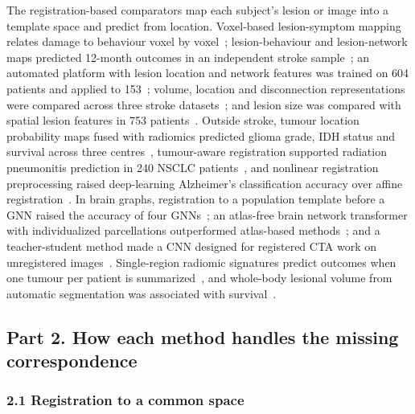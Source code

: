 \documentclass[journal,onecolumn]{IEEEtran}
\begin{document}
The registration-based comparators map each subject's lesion or image into a template space and predict from location. Voxel-based lesion-symptom mapping relates damage to behaviour voxel by voxel~\cite{Bates2003Voxel}; lesion-behaviour and lesion-network maps predicted 12-month outcomes in an independent stroke sample~\cite{Bowren2022Poststroke}; an automated platform with lesion location and network features was trained on 604 patients and applied to 153~\cite{Brzus2026Clinical}; volume, location and disconnection representations were compared across three stroke datasets~\cite{Bonkhoff2024Prediction}; and lesion size was compared with spatial lesion features in 753 patients~\cite{Sperber2023Stroke}. Outside stroke, tumour location probability maps fused with radiomics predicted glioma grade, IDH status and survival across three centres~\cite{Liu2023Coordinatized}, tumour-aware registration supported radiation pneumonitis prediction in 240 NSCLC patients~\cite{Choi2026Tumor}, and nonlinear registration preprocessing raised deep-learning Alzheimer's classification accuracy over affine registration~\cite{Fujibayashi2021Nonlinear}. In brain graphs, registration to a population template before a GNN raised the accuracy of four GNNs~\cite{Gurler2023Template}; an atlas-free brain network transformer with individualized parcellations outperformed atlas-based methods~\cite{Huang2026Atlas}; and a teacher-student method made a CNN designed for registered CTA work on unregistered images~\cite{Dong2024Self}. Single-region radiomic signatures predict outcomes when one tumour per patient is summarized~\cite{Aerts2014Decoding}, and whole-body lesional volume from automatic segmentation was associated with survival~\cite{Kendrick2022Fully}.

\subsection{Part 2. How each method handles the missing correspondence}

\subsubsection{2.1 Registration to a common space}
\end{document}
